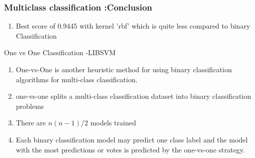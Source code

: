 \documentclass[12pt,t]{beamer}
\begin{document}
\begin{frame}
    \frametitle{Multiclass classification :Conclusion}
    \scriptsize
    \begin{enumerate}
        \item Best score of 0.9445 with kernel 'rbf' which is quite less compared to binary Classification

    \end{enumerate}
    \begin{block}{One vs One Classification -LIBSVM}
        \begin{enumerate}
            \item One-vs-One  is another heuristic method for using binary 
            classification algorithms for multi-class classification.
            \item one-vs-one splits a multi-class classification dataset
            into binary classification problems
            \item There are $n(n-1)/2$ models trained 
            \item Each binary classification model may predict one class label and the model 
            with the most predictions or votes is predicted by the one-vs-one strategy.
        \end{enumerate}
    

        
    \end{block}

    

\end{frame}
\end{document}
